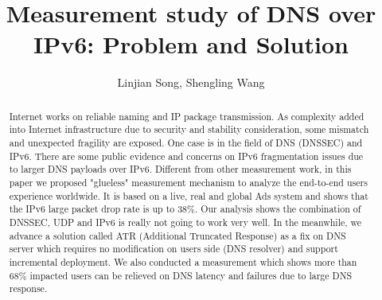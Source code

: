 \documentclass[sigconf]{acmart}
\begin{document}
\title{Measurement study of DNS over IPv6: Problem and Solution}


\author{Linjian Song, Shengling Wang}

\renewcommand{\shortauthors}{X.et al.}

\begin{abstract}
   Internet works on reliable naming and IP package transmission. 
   As complexity added into Internet infrastructure due to security 
   and stability consideration, some mismatch and unexpected fragility 
   are exposed. One case is in the field of DNS (DNSSEC) and IPv6. 
   There are some public evidence and concerns on IPv6 fragmentation 
   issues due to larger DNS payloads over IPv6. Different from other 
   measurement work, in this paper we proposed "glueless" measurement 
   mechanism to analyze the end-to-end users experience worldwide. 
   It is based on a live, real and global Ads system and shows that 
   the IPv6 large packet drop rate is up to 38\%. Our analysis shows 
   the combination of DNSSEC, UDP and IPv6 is really not going to work 
   very well. In the meanwhile, we advance a solution called ATR 
   (Additional Truncated Response) as a fix on DNS server which 
   requires no modification on users side (DNS resolver) and support 
   incremental deployment. We also conducted a measurement which shows 
   more than 68\% impacted users can be relieved on DNS latency and 
   failures due to large DNS response.
\end{abstract}

\maketitle





\end{document}
